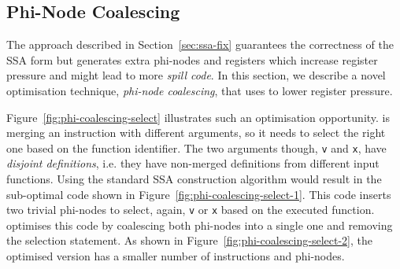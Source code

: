 


\subsection{Phi-Node Coalescing} \label{sec:pncoalescing}

The approach described in Section~\ref{sec:ssa-fix} guarantees the correctness of the SSA form but generates extra
phi-nodes and registers which increase register pressure and might lead to more \textit{spill code}. In this section, we describe a novel optimisation technique, \textit{phi-node coalescing}, that {\ProjName} uses to lower register pressure.


Figure~\ref{fig:phi-coalescing-select} illustrates such an optimisation opportunity. {\ProjName} is merging an instruction with different arguments,
so it needs to select the right one based on the function identifier. The two arguments though, \texttt{v} and \texttt{x}, have \textit{disjoint definitions},
i.e. they have non-merged definitions from different input functions. Using the standard SSA construction algorithm would result in
the sub-optimal code shown in Figure~\ref{fig:phi-coalescing-select-1}. This code inserts two trivial phi-nodes to select, again, \texttt{v} or \texttt{x}
based on the executed function. {\ProjName} optimises this code by coalescing both phi-nodes into a single one and removing the
selection statement. As shown in Figure~\ref{fig:phi-coalescing-select-2}, the optimised version has a smaller number of instructions and
phi-nodes.


